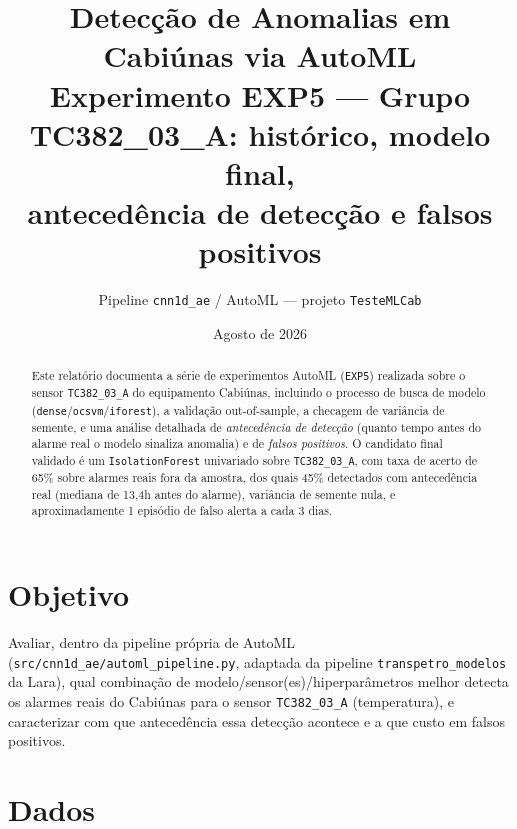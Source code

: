 \documentclass[11pt,a4paper]{article}
\title{Detecção de Anomalias em Cabiúnas via AutoML\\
\large Experimento EXP5 --- Grupo TC382\_03\_A: histórico, modelo final,\\
antecedência de detecção e falsos positivos}
\author{Pipeline \texttt{cnn1d\_ae} / AutoML --- projeto \texttt{TesteMLCab}}
\date{Agosto de 2026}
\begin{document}
\maketitle

\begin{abstract}
Este relatório documenta a série de experimentos AutoML (\texttt{EXP5}) realizada
sobre o sensor \texttt{TC382\_03\_A} do equipamento Cabiúnas, incluindo o processo
de busca de modelo (\texttt{dense}/\texttt{ocsvm}/\texttt{iforest}), a validação
out-of-sample, a checagem de variância de semente, e uma análise detalhada de
\emph{antecedência de detecção} (quanto tempo antes do alarme real o modelo
sinaliza anomalia) e de \emph{falsos positivos}. O candidato final validado é um
\texttt{IsolationForest} univariado sobre \texttt{TC382\_03\_A}, com taxa de
acerto de 65\% sobre alarmes reais fora da amostra, dos quais 45\% detectados
com antecedência real (mediana de 13,4h antes do alarme), variância de semente
nula, e aproximadamente 1 episódio de falso alerta a cada 3 dias.
\end{abstract}

\tableofcontents

\section{Objetivo}

Avaliar, dentro da pipeline própria de AutoML (\texttt{src/cnn1d\_ae/automl\_pipeline.py},
adaptada da pipeline \texttt{transpetro\_modelos} da Lara), qual combinação de
modelo/sensor(es)/hiperparâmetros melhor detecta os alarmes reais do
Cabiúnas para o sensor \texttt{TC382\_03\_A} (temperatura), e caracterizar
com que antecedência essa detecção acontece e a que custo em falsos positivos.

\section{Dados}
\label{sec:dados}
\end{document}
